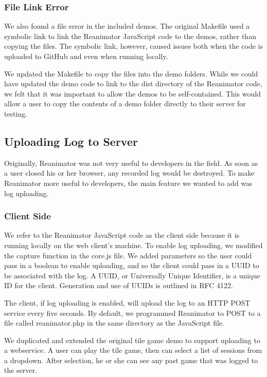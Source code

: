 \documentclass[12pt,journal]{IEEEtran}
\begin{document}
\subsubsection{File Link Error}
We also found a file error in the included demos. The original Makefile used a symbolic link to link the Reanimator JavaScript code to the demos, rather than copying the files. The symbolic link, however, caused issues both when the code is uploaded to GitHub and even when running locally.
\par
We updated the Makefile to copy the files into the demo folders. While we could have updated the demo code to link to the dist directory of the Reanimator code, we felt that it was important to allow the demos to be self-contained. This would allow a user to copy the contents of a demo folder directly to their server for testing.

\subsection{Uploading Log to Server}
Originally, Reanimator was not very useful to developers in the field. As soon as a user closed his or her browser, any recorded log would be destroyed. To make Reanimator more useful to developers, the main feature we wanted to add was log uploading.

\subsubsection{Client Side}
We refer to the Reanimator JavaScript code as the client side because it is running locally on the web client’s machine. To enable log uploading, we modified the capture function in the core.js file. We added parameters so the user could pass in a boolean to enable uploading, and so the client could pass in a UUID to be associated with the log. A UUID, or Universally Unique Identifier, is a unique ID for the client. Generation and use of UUIDs is outlined in RFC 4122. \cite{p.leachm.meallingr.salz2005}
\par
The client, if log uploading is enabled, will upload the log to an HTTP POST service every five seconds. By default, we programmed Reanimator to POST to a file called reanimator.php in the same directory as the JavaScript file.
\par
We duplicated and extended the original tile game demo to support uploading to a webservice. A user can play the tile game, then can select a list of sessions from a dropdown. After selection, he or she can see any past game that was logged to the server.
\end{document}
